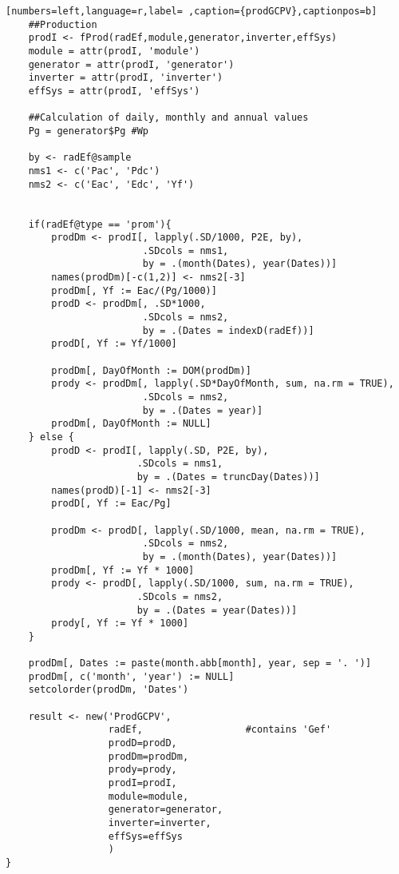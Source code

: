 \begin{lstlisting}[numbers=left,language=r,label= ,caption={prodGCPV},captionpos=b]
    ##Production
    prodI <- fProd(radEf,module,generator,inverter,effSys)
    module = attr(prodI, 'module')
    generator = attr(prodI, 'generator')
    inverter = attr(prodI, 'inverter')
    effSys = attr(prodI, 'effSys')

    ##Calculation of daily, monthly and annual values
    Pg = generator$Pg #Wp

    by <- radEf@sample
    nms1 <- c('Pac', 'Pdc')
    nms2 <- c('Eac', 'Edc', 'Yf')


    if(radEf@type == 'prom'){
        prodDm <- prodI[, lapply(.SD/1000, P2E, by),
                        .SDcols = nms1,
                        by = .(month(Dates), year(Dates))]
        names(prodDm)[-c(1,2)] <- nms2[-3]
        prodDm[, Yf := Eac/(Pg/1000)]
        prodD <- prodDm[, .SD*1000,
                        .SDcols = nms2,
                        by = .(Dates = indexD(radEf))]
        prodD[, Yf := Yf/1000]

        prodDm[, DayOfMonth := DOM(prodDm)]
        prody <- prodDm[, lapply(.SD*DayOfMonth, sum, na.rm = TRUE),
                        .SDcols = nms2,
                        by = .(Dates = year)]
        prodDm[, DayOfMonth := NULL]
    } else {
        prodD <- prodI[, lapply(.SD, P2E, by),
                       .SDcols = nms1,
                       by = .(Dates = truncDay(Dates))]
        names(prodD)[-1] <- nms2[-3]
        prodD[, Yf := Eac/Pg]

        prodDm <- prodD[, lapply(.SD/1000, mean, na.rm = TRUE),
                        .SDcols = nms2,
                        by = .(month(Dates), year(Dates))]
        prodDm[, Yf := Yf * 1000]
        prody <- prodD[, lapply(.SD/1000, sum, na.rm = TRUE),
                       .SDcols = nms2,
                       by = .(Dates = year(Dates))]
        prody[, Yf := Yf * 1000]
    }

    prodDm[, Dates := paste(month.abb[month], year, sep = '. ')]
    prodDm[, c('month', 'year') := NULL]
    setcolorder(prodDm, 'Dates')

    result <- new('ProdGCPV',
                  radEf,                  #contains 'Gef'
                  prodD=prodD,
                  prodDm=prodDm,
                  prody=prody,
                  prodI=prodI,
                  module=module,
                  generator=generator,
                  inverter=inverter,
                  effSys=effSys
                  )
}
\end{lstlisting}
